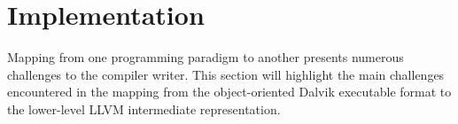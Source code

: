 \chapter{Implementation}

Mapping from one programming paradigm to another presents numerous challenges to the compiler writer. This section will highlight the main challenges encountered in the mapping from the object-oriented Dalvik executable format to the lower-level LLVM intermediate representation.













%

%

%

%

